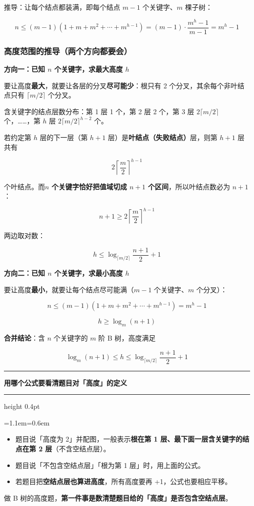 \documentclass[11pt,openany,UTF8]{ctexbook}
\newcommand{\callouthead}[2]{%
  \par\addvspace{7pt}\noindent
  {\color{#1}\rule[-0.15em]{3pt}{1.05em}}\hspace{0.5em}%
  {\bfseries\color{#1}#2}\par\nobreak\vspace{-0.35em}%
  {\color{rulesep}\hrule height 0.4pt}\nobreak\vspace{0.45em}%
  \begingroup\small\setlength{\parindent}{0pt}%
  \leftskip=1.1em\rightskip=0.6em\noindent\ignorespaces}
\newcommand{\calloutend}{\par\endgroup\addvspace{7pt}}
\newenvironment{callwarn}[1]{\callouthead{warnbar}{#1}}{\calloutend}
\begin{document}
推导：让每个结点都装满，即每个结点 $m-1$ 个关键字、$m$ 棵子树：

\[n\le (m-1)\left(1+m+m^{2}+\cdots+m^{h-1}\right)=(m-1)\cdot\frac{m^{h}-1}{m-1}=m^{h}-1\]

\subsubsection{高度范围的推导（两个方向都要会）}

\textbf{方向一：已知 $n$ 个关键字，求最大高度 $h$}

要让高度\textbf{最大}，就要让各层的分叉\textbf{尽可能少}：根只有 2 个分叉，其余每个非叶结点只有 $\lceil m/2\rceil$ 个分叉。

含关键字的结点层数分布：第 1 层 1 个，第 2 层 2 个，第 3 层 $2\lceil m/2\rceil$ 个，……，第 $h$ 层 $2\lceil m/2\rceil^{h-2}$ 个。

若约定第 $h$ 层的下一层（第 $h+1$ 层）是\textbf{叶结点（失败结点）}层，则第 $h+1$ 层共有

\[2\left\lceil \frac{m}{2}\right\rceil^{h-1}\]

个叶结点。而\textbf{$n$ 个关键字恰好把值域切成 $n+1$ 个区间}，所以叶结点数必为 $n+1$：

\[n+1\ge 2\left\lceil \frac{m}{2}\right\rceil^{h-1}\]

两边取对数：

\[\boxed{h\le \log_{\lceil m/2\rceil}\frac{n+1}{2}+1}\]

\textbf{方向二：已知 $n$ 个关键字，求最小高度 $h$}

要让高度\textbf{最小}，就要让每个结点尽可能满（$m-1$ 个关键字、$m$ 个分叉）：

\[n\le (m-1)\left(1+m+m^{2}+\cdots+m^{h-1}\right)=m^{h}-1\]

\[\boxed{h\ge \log_m(n+1)}\]

\textbf{合并结论}：含 $n$ 个关键字的 $m$ 阶 B 树，高度满足

\[\log_m(n+1)\le h\le \log_{\lceil m/2\rceil}\frac{n+1}{2}+1\]

\begin{callwarn}{用哪个公式要看清题目对「高度」的定义}
\begin{itemize}
\item 题目说「高度为 2」并配图，一般表示\textbf{根在第 1 层、最下面一层含关键字的结点在第 2 层}（不含空结点层）。
\item 题目说「不包含空结点层」「根为第 1 层」时，用上面的公式。
\item 若题目把\textbf{空结点层也算进高度}，所有高度要再 +1，公式也要相应平移。
\end{itemize}
做 B 树的高度题，\textbf{第一件事是数清楚题目给的「高度」是否包含空结点层}。

\end{callwarn}
\end{document}
